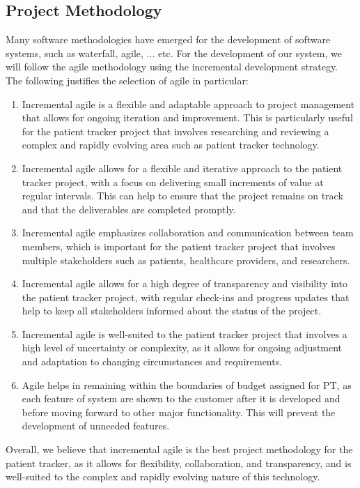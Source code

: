 \documentclass[12pt]{article}
\begin{document}
		\subsection{Project Methodology}
	
			\quad Many software methodologies have emerged for the development of software systems, such as waterfall, agile, ... etc. For the development of our system, we will follow the agile methodology using the incremental development strategy. The following justifies the selection of agile in particular:
				\begin{enumerate}
				\item Incremental agile is a flexible and adaptable approach to project management that allows for ongoing iteration and improvement. This is particularly useful for the patient tracker project that involves researching and reviewing a complex and rapidly evolving area such as patient tracker technology.
				\item Incremental agile allows for a flexible and iterative approach to the patient tracker project, with a focus on delivering small increments of value at regular intervals. This can help to ensure that the project remains on track and that the deliverables are completed promptly.
				\item Incremental agile emphasizes collaboration and communication between team members, which is important for the patient tracker project that involves multiple stakeholders such as patients, healthcare providers, and researchers.
				\item Incremental agile allows for a high degree of transparency and visibility into the patient tracker project, with regular check-ins and progress updates that help to keep all stakeholders informed about the status of the project.
				\item Incremental agile is well-suited to the patient tracker project that involves a high level of uncertainty or complexity, as it allows for ongoing adjustment and adaptation to changing circumstances and requirements.
				\item Agile helps in remaining within the boundaries of budget assigned for PT, as each feature of system are shown to the customer after it is developed and before moving forward to other major functionality. This will prevent the development of unneeded features.
				\end{enumerate}
				
			Overall, we believe that incremental agile is the best project methodology for the patient tracker, as it allows for flexibility, collaboration, and transparency, and is well-suited to the complex and rapidly evolving nature of this technology.
						
\end{document}
